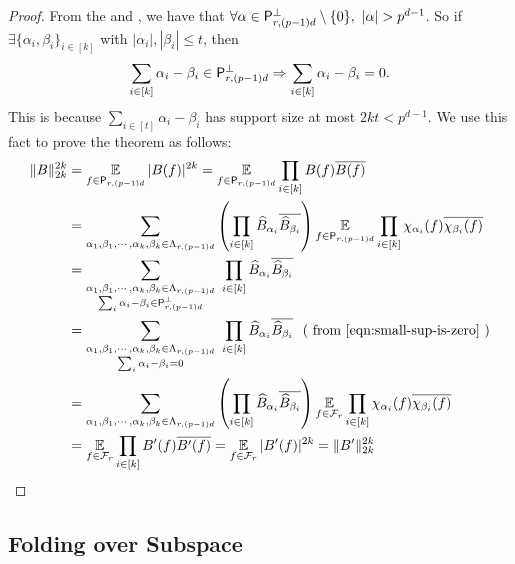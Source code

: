\begin{proof}
From the  and , we have that $\forall
\alpha \in \mathsf P^{\perp}_{r,(p-1)d}\setminus \{0\},~|\alpha| > p^{d-1}$. So if
$\exists \{\alpha_i,\beta_i \}_{i \in [k]}$ with $|\alpha_i|,|\beta_i| \leq t$,
then \begin{equation} \label{eqn:small-sup-is-zero} \sum_{i \in [k]} \alpha_i
-\beta_i \in \mathsf P^{\perp}_{r,(p-1)d} \Rightarrow \sum_{i \in [k]} \alpha_i -\beta_i =
0. \end{equation} This is because $\sum_{i \in [t]} \alpha_i -\beta_i$ has
support size at most $2kt < p^{d-1}$. We use this fact to prove the theorem as
follows: \begin{align*} \|B\|_{2k}^{2k} & = \E_{f \in \Pe_{r,(p-1)d}} |B(f)|^{2k} 
= \E_{f \in \Pe_{r,(p-1)d}} \prod_{i \in [k]}B(f)\overline {B(f)}\\
&=\sum_{\alpha_1,\beta_1,\cdots,\alpha_k,\beta_k \in \Lambda_{r,(p-1)d}}
\left(\prod_{i \in [k]}\widehat B_{\alpha_i} \overline{\widehat
B_{\beta_i}}\right) \E_{f \in \Pe_{r,(p-1)d}} \prod_{i \in [k]} \chi_{\alpha_i}(f)
\overline{\chi_{\beta_i}(f)}\\
&=\sum_{\substack{\alpha_1,\beta_1,\cdots,\alpha_k,\beta_k \in \Lambda_{r,(p-1)d}\\
\sum_i \alpha_i -\beta_i \in \Pe^{\perp}_{r,(p-1)d}}}~ \prod_{i \in [k]}\widehat
B_{\alpha_i} \overline{\widehat B_{\beta_i}} \\
&=\sum_{\substack{\alpha_1,\beta_1,\cdots,\alpha_k,\beta_k \in \Lambda_{r,(p-1)d} \\
\sum_i \alpha_i -\beta_i = 0}}~ \prod_{i \in [k]}\widehat B_{\alpha_i}
\overline{\widehat B_{\beta_i}}~~(\text{ from }
\eqref{eqn:small-sup-is-zero}~)\\ &=
\sum_{\alpha_1,\beta_1,\cdots,\alpha_k,\beta_k\in \Lambda_{r,(p-1)d}} \left(\prod_{i
\in [k]}\widehat B_{\alpha_i} \overline{\widehat B_{\beta_i}}\right) \E_{f \in
\Ef_r} \prod_{i \in [k]} \chi_{\alpha_i}(f) \overline{\chi_{\beta_i}(f)}\\ &=
\E_{f \in \Ef_r} \prod_{i \in[k]}B'(f)\overline {B'(f)} = \E_{f \in \Ef_r}
|B'(f)|^{2k}=\|B'\|_{2k}^{2k} \end{align*} \end{proof}


\subsection{Folding over Subspace} 

